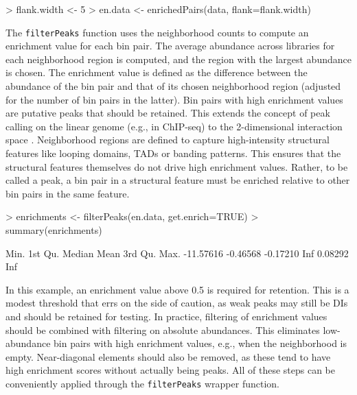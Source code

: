 \documentclass[12pt]{report}
\renewenvironment{Schunk}{\vspace{0pt}}{\vspace{0pt}}
\newcommand{\code}[1]{{\small\texttt{#1}}}
\begin{document}
\begin{Schunk}
\begin{Sinput}
> flank.width <- 5
> en.data <- enrichedPairs(data, flank=flank.width)
\end{Sinput}
\end{Schunk}

The \code{filterPeaks} function uses the neighborhood counts to compute an enrichment value for each bin pair.
The average abundance across libraries for each neighborhood region is computed, and the region with the largest abundance is chosen.
The enrichment value is defined as the difference between the abundance of the bin pair and that of its chosen neighborhood region (adjusted for the number of bin pairs in the latter). 
Bin pairs with high enrichment values are putative peaks that should be retained.
This extends the concept of peak calling on the linear genome (e.g., in ChIP-seq) to the 2-dimensional interaction space \citep{rao2014kilobase}.
Neighborhood regions are defined to capture high-intensity structural features like looping domains, TADs or banding patterns.
This ensures that the structural features themselves do not drive high enrichment values.
Rather, to be called a peak, a bin pair in a structural feature must be enriched relative to other bin pairs in the same feature.

\begin{Schunk}
\begin{Sinput}
> enrichments <- filterPeaks(en.data, get.enrich=TRUE)
> summary(enrichments)   
\end{Sinput}
\begin{Soutput}
     Min.   1st Qu.    Median      Mean   3rd Qu.      Max. 
-11.57616  -0.46568  -0.17210       Inf   0.08292       Inf 
\end{Soutput}
\end{Schunk}

In this example, an enrichment value above 0.5 is required for retention.
This is a modest threshold that errs on the side of caution, as weak peaks may still be DIs and should be retained for testing.
In practice, filtering of enrichment values should be combined with filtering on absolute abundances.
This eliminates low-abundance bin pairs with high enrichment values, e.g., when the neighborhood is empty.
Near-diagonal elements should also be removed, as these tend to have high enrichment scores without actually being peaks.
All of these steps can be conveniently applied through the \code{filterPeaks} wrapper function.
\end{document}
